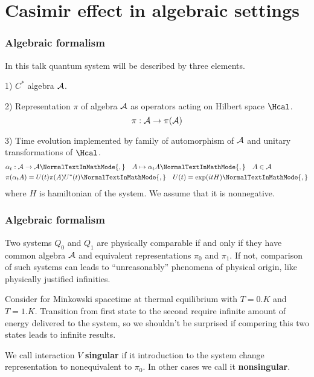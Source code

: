 \documentclass[10pt,t]{beamer}
\begin{document}
\section{Casimir effect in algebraic settings}



\begin{frame}
  \frametitle{Algebraic formalism}


  In this talk quantum system will be described by three elements.

  1) $C^{ * }$ algebra $\mathcal{A}$.

  2) Representation $\pi$ of algebra $\mathcal{A}$ as operators acting on
  Hilbert space $\Hcal$.
  \begin{equation}
    \label{eq:Herdegens-approach-01}
    \pi: \mathcal{A} \to \pi( \mathcal{A} )
  \end{equation}

  3) Time evolution implemented by family of automorphism of $\mathcal{A}$ and
  unitary transformations of $\Hcal$.
  \begin{align}
    \label{eq:Herdegens-approach-02-A}
    &\alpha_{ t }: \Acal \to \Acal\NormalTextInMathMode{,} \quad
      A \mapsto \alpha_{ t }A\NormalTextInMathMode{,} \quad
      A \in \Acal \\
    \label{eq:Herdegens-approach-02-B}
    &\pi( \alpha_{ t } A ) = U( t ) \pi( A ) U^{ * }( t )\NormalTextInMathMode{,}
      \quad
      U( t ) = \exp( it H )\NormalTextInMathMode{,}
  \end{align}
  where $H$ is hamiltonian of the system. We assume that it is
  nonnegative.

\end{frame}





\begin{frame}
  \frametitle{Algebraic formalism}


  Two systems $Q_{ 0 }$ and $Q_{ 1 }$ are physically comparable if and
  only if they have common algebra $\mathcal{A}$ and equivalent
  representations $\pi_{ 0 }$ and $\pi_{ 1 }$. If not, comparison of
  such systems can leads to ``unreasonably'' phenomena of physical
  origin, like physically justified infinities.

  Consider for Minkowski spacetime at thermal equilibrium with
  $T = 0 \si{.K}$ and $T = 1 \si{.K}$. Transition from first state to
  the second require infinite amount of energy delivered to the
  system, so we shouldn't be surprised if compering this two states
  leads to infinite results.

  We call interaction $V$ \textbf{singular} if it introduction to the
  system change representation to nonequivalent to $\pi_{ 0 }$. In
  other cases we call it \textbf{nonsingular}.

\end{frame}
\end{document}
